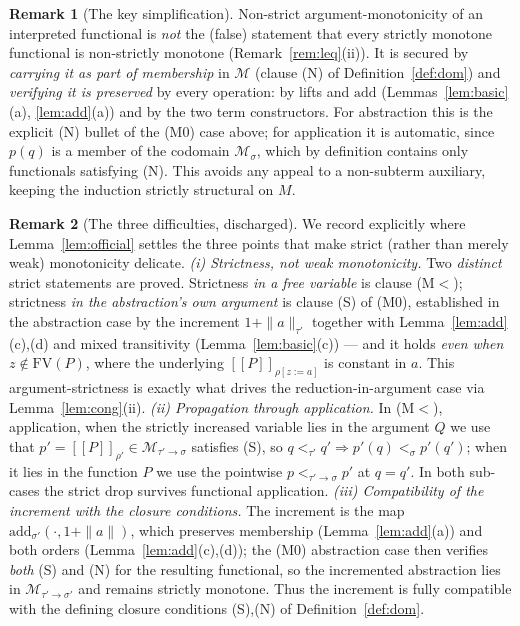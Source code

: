 \documentclass{amsart}
\theoremstyle{definition}
\newtheorem{remark}{Remark}
\newcommand{\interp}[1]{[\![#1]\!]}
\newcommand{\FV}{\mathrm{FV}}
\begin{document}
\begin{remark}[The key simplification]\label{rem:keyfix}
Non-strict argument-monotonicity of an interpreted functional is \emph{not} the (false)
statement that every strictly monotone functional is non-strictly monotone
(Remark~\ref{rem:leq}(ii)). It is secured by \emph{carrying it as part of membership} in
$\mathcal M$ (clause (N) of Definition~\ref{def:dom}) and \emph{verifying it is preserved}
by every operation: by lifts and $\mathrm{add}$ (Lemmas~\ref{lem:basic}(a),
\ref{lem:add}(a)) and by the two term constructors. For abstraction this is the explicit
(N) bullet of the (M0) case above; for application it is automatic, since $p(q)$ is a member
of the codomain $\mathcal M_\sigma$, which by definition contains only functionals satisfying
(N). This avoids any appeal to a non-subterm auxiliary, keeping the induction strictly
structural on $M$.
\end{remark}

\begin{remark}[The three difficulties, discharged]\label{rem:threehard}
We record explicitly where Lemma~\ref{lem:official} settles the three points that make
strict (rather than merely weak) monotonicity delicate.
\emph{(i) Strictness, not weak monotonicity.} Two \emph{distinct} strict statements are
proved. Strictness \emph{in a free variable} is clause (M$<$); strictness \emph{in the
abstraction's own argument} is clause (S) of (M0), established in the abstraction case by the
increment $1{+}\|a\|_{\tau'}$ together with Lemma~\ref{lem:add}(c),(d) and mixed transitivity
(Lemma~\ref{lem:basic}(c)) --- and it holds \emph{even when} $z\notin\FV(P)$, where the
underlying $\interp{P}_{\rho[z:=a]}$ is constant in $a$. This argument-strictness is exactly
what drives the reduction-in-argument case via Lemma~\ref{lem:cong}(ii).
\emph{(ii) Propagation through application.} In (M$<$), application, when the strictly
increased variable lies in the argument $Q$ we use that $p'=\interp{P}_{\rho'}\in
\mathcal M_{\tau'\to\sigma}$ satisfies (S), so $q<_{\tau'}q'\Rightarrow p'(q)<_\sigma p'(q')$;
when it lies in the function $P$ we use the pointwise $p<_{\tau'\to\sigma}p'$ at $q=q'$. In
both sub-cases the strict drop survives functional application.
\emph{(iii) Compatibility of the increment with the closure conditions.} The increment is the
map $\mathrm{add}_{\sigma'}(\cdot,1{+}\|a\|)$, which preserves membership
(Lemma~\ref{lem:add}(a)) and both orders (Lemma~\ref{lem:add}(c),(d)); the (M0) abstraction
case then verifies \emph{both} (S) and (N) for the resulting functional, so the incremented
abstraction lies in $\mathcal M_{\tau'\to\sigma'}$ and remains strictly monotone. Thus the
increment is fully compatible with the defining closure conditions (S),(N) of
Definition~\ref{def:dom}.
\end{remark}
\end{document}
